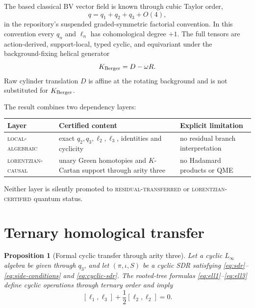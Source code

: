 \documentclass[11pt]{article}
\newtheorem{proposition}[theorem]{Proposition}
\theoremstyle{definition}
\theoremstyle{remark}
\begin{document}
The based classical BV vector field is known through cubic Taylor order,
\begin{equation}
 q=q_1+q_2+q_3+O(4),
\end{equation}
in the repository's suspended graded-symmetric factorial convention.  In
this convention every $q_n$ and $\ell_n$ has cohomological degree $+1$.  The
full tensors are action-derived, support-local, typed cyclic, and equivariant
under the background-fixing helical generator
\begin{equation}
 K_{\rm Berger}=D-\omega R.
\end{equation}
Raw cylinder translation $D$ is affine at the rotating background and is not
substituted for $K_{\rm Berger}$.

The result combines two dependency layers:
\begin{center}
\begin{tabularx}{0.96\textwidth}{>{\small}p{}YY}
\toprule
Layer & Certified content & Explicit limitation\\
\midrule
\textsc{local-algebraic}
 & exact $q_2,q_3,\ell_2,\ell_3$, identities and cyclicity
 & no residual branch interpretation\\
\textsc{lorentzian-causal}
 & unary Green homotopies and $K$-Cartan support through arity three
 & no Hadamard products or QME\\
\bottomrule
\end{tabularx}
\end{center}
Neither layer is silently promoted to \textsc{residual-transferred} or
\textsc{lorentzian-certified} quantum status.

\section{Ternary homological transfer}\label{sec:transfer}

\begin{proposition}[Formal cyclic transfer through arity three]
\label{prop:formal-transfer}
Let a cyclic $L_\infty$ algebra be given through $q_3$, and let
$(\pi,\iota,S)$ be a cyclic SDR satisfying
\eqref{eq:sdr}--\eqref{eq:side-conditions} and
\eqref{eq:cyclic-sdr}.  The rooted-tree formulas
\eqref{eq:ell1}--\eqref{eq:ell3} define cyclic operations through ternary
order and imply
\begin{equation}\label{eq:formal-linf3}
 [\ell_1,\ell_3]+\frac12[\ell_2,\ell_2]=0.
\end{equation}
\end{proposition}
\end{document}
